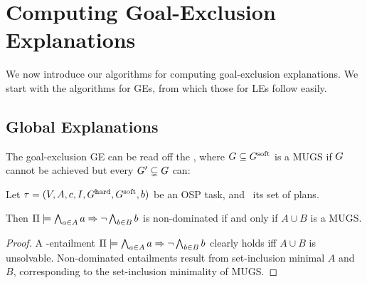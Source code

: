 \section{Computing Goal-Exclusion Explanations}
\label{algorithms}


We now introduce our algorithms for computing goal-exclusion
explanations. We start with the algorithms for GEs, from which those
for LEs follow easily.




\subsection{Global Explanations}
\label{algorithms:ge}

The goal-exclusion GE can be read off the , where $G \subseteq G^{\text{\textup{soft}}}$ is a MUGS
if $G$ cannot be achieved but every $G' \subsetneq G$
can:

\begin{proposition}
\label{pro:ge-from-mugs}
Let $\tau =
(V,\allowbreak A,\allowbreak{\ensuremath{c}},\allowbreak I,\allowbreak G^{\text{\textup{hard}}},\allowbreak G^{\text{\textup{soft}}},\allowbreak{\ensuremath{b}})$
be an OSP task, and \plans\ its set of plans.

Then $\Pi \models \bigwedge_{a \in A} a \Rightarrow \neg \bigwedge_{b \in B}
  b$ is non-dominated if and only if $A \cup B$ is a MUGS.
\end{proposition}

\begin{proof}
A \plans-entailment $\Pi \models \bigwedge_{a \in A} a \Rightarrow \neg
  \bigwedge_{b \in B} b$ clearly holds iff $A \cup B$ is
unsolvable. Non-dominated entailments result from set-inclusion
minimal $A$ and $B$, corresponding to the set-inclusion minimality of
MUGS.
\end{proof}

